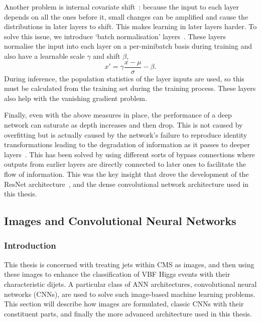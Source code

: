 Another problem is internal covariate shift~\cite{BatchNorm}: because the input to each layer depends on all the ones before it, small changes can be amplified and cause the distributions in later layers to shift. This makes learning in later layers harder. 
To solve this issue, we introduce `batch normalisation' layers~\cite{BatchNorm}. These layers normalise the input into each layer on a per-minibatch basis during training and also have a learnable scale $\gamma$ and shift $\beta$,
\begin{equation}
    x{'}=\gamma\frac{x-\mu}{\sigma} - \beta.
\end{equation}
During inference, the population statistics of the layer inputs are used, so this must be calculated from the training set during the training process. These layers also help with the vanishing gradient problem. 

Finally, even with the above measures in place, the performance of a deep network can saturate as depth increases and then drop. This is not caused by overfitting but is actually caused by the network's failure to reproduce identity transformations leading to the degradation of information as it passes to deeper layers~\cite{ResNet}. This has been solved by using different sorts of bypass connections where outputs from earlier layers are directly connected to later ones to facilitate the flow of information. This was the key insight that drove the development of the ResNet architecture~\cite{ResNet}, and the dense convolutional network architecture used in this thesis.  


\subsection{Images and Convolutional Neural Networks}

\subsubsection{Introduction}
This thesis is concerned with treating jets within CMS as images, and then using these images to enhance the classification of VBF Higgs events with their characteristic dijets. 
A particular class of ANN architectures, convolutional neural networks (CNNs), are used to solve such image-based machine learning problems.
This section will describe how images are formulated, classic CNNs with their constituent parts, and finally the more advanced architecture used in this thesis. 


